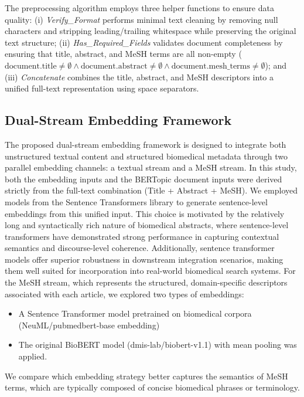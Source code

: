 \documentclass[authorproof,JACIII,researchpaper]{fujipressarticle}
\begin{document}
The preprocessing algorithm employs three helper functions to ensure data quality: (i) \textit{Verify\_Format} performs minimal text cleaning by removing null characters and stripping leading/trailing whitespace while preserving the original text structure; (ii) \textit{Has\_Required\_Fields} validates document completeness by ensuring that title, abstract, and MeSH terms are all non-empty ($\text{document.title} \neq \emptyset \land \text{document.abstract} \neq \emptyset \land \text{document.mesh\_terms} \neq \emptyset$); and (iii) \textit{Concatenate} combines the title, abstract, and MeSH descriptors into a unified full-text representation using space separators.

{\color{red}%
\subsection{Dual-Stream Embedding Framework}
The proposed dual-stream embedding framework is designed to integrate both unstructured textual content and structured biomedical metadata through two parallel embedding channels: a textual stream and a MeSH stream.
In this study, both the embedding inputs and the BERTopic document inputs were derived strictly from the full-text combination (Title + Abstract + MeSH). We employed models from the Sentence Transformers library to generate sentence-level embeddings from this unified input. This choice is motivated by the relatively long and syntactically rich nature of biomedical abstracts, where sentence-level transformers have demonstrated strong performance in capturing contextual semantics and discourse-level coherence\cite{reimers_sentence-bert_2019}. Additionally, sentence transformer models offer superior robustness in downstream integration scenarios, making them well suited for incorporation into real-world biomedical search systems.
For the MeSH stream, which represents the structured, domain-specific descriptors associated with each article, we explored two types of embeddings:
\begin{itemize}
    \item A Sentence Transformer model pretrained on biomedical corpora (NeuML/pubmedbert-base embedding)
    \item The original BioBERT model (dmis-lab/biobert-v1.1) with mean pooling was applied.
\end{itemize}
We compare which embedding strategy better captures the semantics of MeSH terms, which are typically composed of concise biomedical phrases or terminology.
}%
\end{document}
